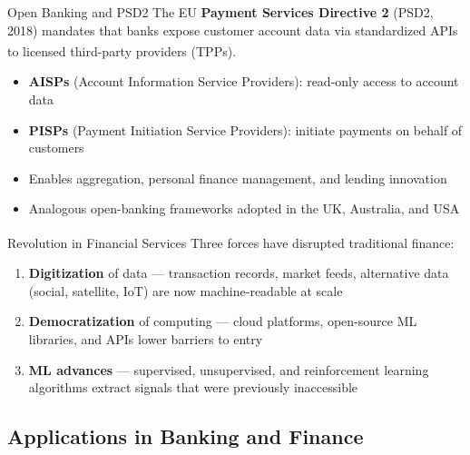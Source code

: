 \begin{v3topic}{Open Banking and PSD2}
    The EU \textbf{Payment Services Directive 2} (PSD2, 2018) mandates that banks expose customer account data via standardized APIs to licensed third-party providers (TPPs)\textsuperscript{\cite[][p.~4]{kardellBuildFinancialSoftware2025}}.
\visualseparator
    \begin{itemize}
        \item \textbf{AISPs} (Account Information Service Providers): read-only access to account data
        \item \textbf{PISPs} (Payment Initiation Service Providers): initiate payments on behalf of customers
        \item Enables aggregation, personal finance management, and lending innovation
        \item Analogous open-banking frameworks adopted in the UK, Australia, and USA
    \end{itemize}

\end{v3topic}
\begin{v3topic}{Revolution in Financial Services}
    Three forces have disrupted traditional finance\textsuperscript{\cite[][pp.~1--2]{jansenMachineLearningAlgorithmic2020}}:
\visualseparator
    \begin{enumerate}
        \item \textbf{Digitization} of data — transaction records, market feeds, alternative data (social, satellite, IoT) are now machine-readable at scale
        \item \textbf{Democratization} of computing — cloud platforms, open-source ML libraries, and APIs lower barriers to entry
        \item \textbf{ML advances} — supervised, unsupervised, and reinforcement learning algorithms extract signals that were previously inaccessible
    \end{enumerate}

\end{v3topic}

\subsection{Applications in Banking and Finance}



